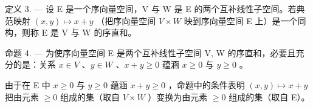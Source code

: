 定义 3. --- 设 E 是一个序向量空间，V 与 W 是 E 的两个互补线性子空间。若典范映射 \((x,y)\mapsto x+y\) （把序向量空间 \(V\times W\) 映到序向量空间 E 上）是一个同构，则称 E 是 V 与 W 的序直和。

命题 4. --- 为使序向量空间 E 是两个互补线性子空间 V, W 的序直和，必要且充分的是：关系 \(x \in V\) 、\(y \in W\) 、\(x + y \geqslant 0\) 蕴涵 \(x \geqslant 0\) 与 \(y \geqslant 0\) 。

由于在 E 中 \(x \geqslant 0\) 与 \(y \geqslant 0\) 蕴涵 \(x + y \geqslant 0\) ，命题中的条件表明 \((x, y) \mapsto x + y\) 把由元素 \(\geqslant 0\) 组成的集（取自 \(V \times W\) ）变换为由元素 \(\geqslant 0\) 组成的集（取自 E）。

